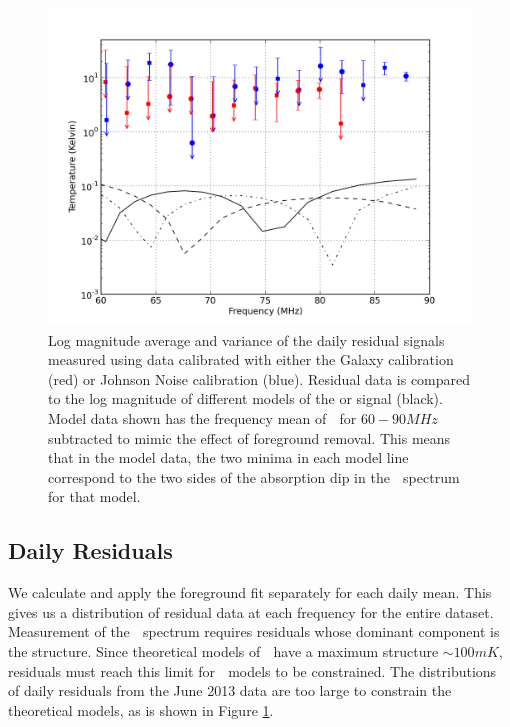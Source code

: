 \begin{figure}[htb]
\begin{center}
\includegraphics[width=0.95\linewidth]{Data_analysis/figures/joint_log_means.png}
\caption{Log magnitude average and variance of the daily residual signals measured using data calibrated with either the Galaxy calibration (red) or Johnson Noise calibration (blue). Residual data is compared to the log magnitude of different models of the \cm or \dtb signal (black). Model data shown has the frequency mean of \dtb $\;$ for $60-90 MHz$ subtracted to mimic the effect of foreground removal. This means that in the model data, the two minima in each model line correspond to the two sides of the absorption dip in the \dtb $\;$ spectrum for that model. }
\label{Fig:resid}
\end{center}
\end{figure}


\subsection{Daily Residuals}

We calculate and apply the foreground fit separately for each daily mean. This gives us a distribution of residual data at each frequency for the entire dataset. Measurement of the \dtb $\;$ spectrum requires residuals whose dominant component is the \cm structure. Since theoretical models of \dtb $\;$ have a maximum structure $\sim 100 mK$, residuals must reach this limit for \dtb $\;$ models to be constrained. The distributions of daily residuals from the June 2013 data are too large to constrain the theoretical models, as is shown in Figure \ref{Fig:resid}. 

